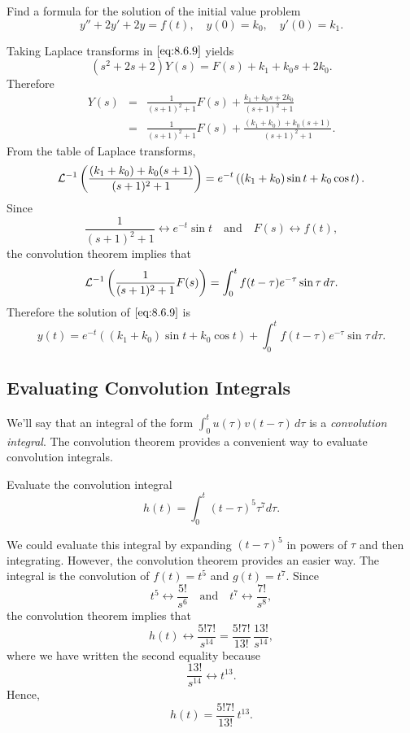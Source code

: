 \documentclass{ximera}
\begin{document}
\begin{example}\label{example:8.6.4}
  Find a formula for the solution of the initial value problem
\begin{equation}\label{eq:8.6.9}
y''+2y'+2y=f(t),\quad y(0)=k_0,\quad y'(0)=k_1.
\end{equation}
\begin{explanation}
Taking Laplace transforms in $\eqref{eq:8.6.9}$ yields
$$
(s^2+2s+2)Y(s)=F(s)+k_1+k_0s+2k_0.
$$
Therefore
\begin{eqnarray*}
Y(s)&=&\frac{1}{(s+1)^2+1}F(s)+\frac{k_1+k_0s+2k_0}{(s+1)^2+1}\\
&=&\frac{1}{(s+1)^2+1}F(s)+\frac{(k_1+k_0)+k_0(s+1)}{(s+1)^2+1}.
\end{eqnarray*}
From the table of Laplace transforms,
$$
{\cal L}^{-1}\left(\frac{(k_1+k_0)+k_0(s+1)}{(s+1)^2+1}\right)=
e^{-t}\left((k_1+k_0)\sin t+k_0\cos t\right).
$$
Since
$$
\frac{1}{(s+1)^2+1}\leftrightarrow e^{-t}\sin t\quad\mbox{and}\quad
 F(s)\leftrightarrow f(t),
$$
the convolution theorem implies that
$$
{\cal L}^{-1}\left(\frac{1}{(s+1)^2+1}F(s)\right)=
\int_0^t  f(t-\tau)e^{-\tau}\sin\tau
\,d\tau.
$$
Therefore the solution of  $\eqref{eq:8.6.9}$ is
\begin{equation}\label{eq:8.6.10}
y(t)=e^{-t}\left((k_1+k_0)\sin t+k_0\cos
t\right)+\int_0^tf(t-\tau)e^{-\tau}\sin\tau\,d\tau.
\end{equation}
\end{explanation}
\end{example}

\subsection*{Evaluating Convolution Integrals}

We'll say that an integral of the form $\int_0^t
u(\tau)v(t-\tau)\,d\tau$ is a \textit{convolution integral}. The
convolution theorem provides a convenient way to evaluate convolution
integrals.

\begin{example}\label{example:8.6.5}
 Evaluate the convolution integral
$$
h(t)=\int_0^t(t-\tau)^5\tau^7 d\tau.
$$
\begin{explanation}
We could evaluate this integral by expanding
$(t-\tau)^5$ in powers of $\tau$ and then integrating. However, the
convolution theorem provides an easier way. The integral is the
convolution of $f(t)=t^5$ and $g(t)=t^7$. Since
$$
t^5\leftrightarrow \frac{5!}{s^6}\quad\mbox{and}\quad  t^7
\leftrightarrow \frac{7!}{s^8},
$$
the convolution theorem implies that
$$
h(t)\leftrightarrow \frac{5!7!}{s^{14}}=\frac{5!7!}{13!}\, \frac{13!}{s^{14}},
$$
where we have written the second equality because
$$
\frac{13!}{ s^{14}}\leftrightarrow t^{13}.
$$
Hence,
$$
h(t)=\frac{5!7!}{13!}\, t^{13}.
$$
\end{explanation}
\end{example}
\end{document}
